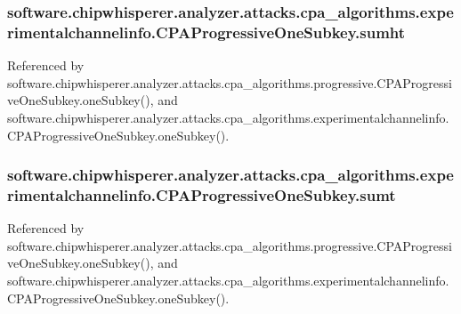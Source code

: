 \subsubsection[{sumht}]{\setlength{\rightskip}{0pt plus 5cm}software.\+chipwhisperer.\+analyzer.\+attacks.\+cpa\+\_\+algorithms.\+experimentalchannelinfo.\+C\+P\+A\+Progressive\+One\+Subkey.\+sumht}\label{classsoftware_1_1chipwhisperer_1_1analyzer_1_1attacks_1_1cpa__algorithms_1_1experimentalchannelinfo_1_1CPAProgressiveOneSubkey_a59f4415f854eac5b02940eb3eccc0d84}


Referenced by software.\+chipwhisperer.\+analyzer.\+attacks.\+cpa\+\_\+algorithms.\+progressive.\+C\+P\+A\+Progressive\+One\+Subkey.\+one\+Subkey(), and software.\+chipwhisperer.\+analyzer.\+attacks.\+cpa\+\_\+algorithms.\+experimentalchannelinfo.\+C\+P\+A\+Progressive\+One\+Subkey.\+one\+Subkey().

\hypertarget{classsoftware_1_1chipwhisperer_1_1analyzer_1_1attacks_1_1cpa__algorithms_1_1experimentalchannelinfo_1_1CPAProgressiveOneSubkey_a4c14a5677ce305927aa6e9f4b45be9ea}{}
\subsubsection[{sumt}]{\setlength{\rightskip}{0pt plus 5cm}software.\+chipwhisperer.\+analyzer.\+attacks.\+cpa\+\_\+algorithms.\+experimentalchannelinfo.\+C\+P\+A\+Progressive\+One\+Subkey.\+sumt}\label{classsoftware_1_1chipwhisperer_1_1analyzer_1_1attacks_1_1cpa__algorithms_1_1experimentalchannelinfo_1_1CPAProgressiveOneSubkey_a4c14a5677ce305927aa6e9f4b45be9ea}


Referenced by software.\+chipwhisperer.\+analyzer.\+attacks.\+cpa\+\_\+algorithms.\+progressive.\+C\+P\+A\+Progressive\+One\+Subkey.\+one\+Subkey(), and software.\+chipwhisperer.\+analyzer.\+attacks.\+cpa\+\_\+algorithms.\+experimentalchannelinfo.\+C\+P\+A\+Progressive\+One\+Subkey.\+one\+Subkey().

\hypertarget{classsoftware_1_1chipwhisperer_1_1analyzer_1_1attacks_1_1cpa__algorithms_1_1experimentalchannelinfo_1_1CPAProgressiveOneSubkey_ac59fcc51f10d03bcc3f47c516d6c683d}{}
